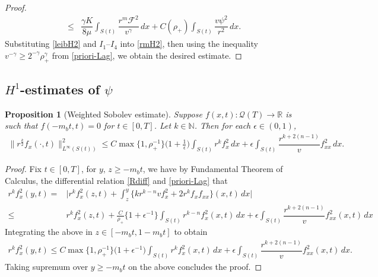 \documentclass[a4paper,12pt,draft]{article}
\newtheorem{proposition}[theorem]{Proposition}
\theoremstyle{remark}
\def\R{\mathbb{R}}
\def\mF{\mathcal{F}}
\def\mQ{\mathcal{Q}}
\begin{document}
\begin{proof}
\begin{align*}
        \le& \dfrac{\gamma K}{8\mu} \int_{S(t)}\!\! \dfrac{r^{m}\mF^2}{v^{\gamma}}\, dx + C(\rho_{+}) \int_{S(t)} \dfrac{v\psi^2}{r^2} \, dx.
    \end{align*}
    Substituting \eqref{leibH2} and $I_1$--$I_4$ into \eqref{rmH2}, then using the inequality $v^{-\gamma} \ge 2^{-\gamma} \rho_+^{\gamma}$ from \eqref{priori-Lag}, we obtain the desired estimate.
\end{proof}

\subsection{\texorpdfstring{$H^1$}{H1}-estimates of \texorpdfstring{$\psi$}{psi}}\label{ssec:H1psi}
\begin{proposition}[Weighted Sobolev estimate]\label{prop:psiSobolev}
    Suppose $f(x,t): \mQ(T)\to \R$ is such that $f(-m_bt,t)=0$ for $t\in[0,T]$. Let $k\in \mathbb{N}$. Then for each $\epsilon \in (0,1)$,
    \begin{align*}
        \| r^{\frac{k}{2}} f_x(\cdot,t) \|_{L^{\infty}(S(t))}^2 \le C \max\{ 1, \rho_{+}^{-1} \} \Big(1 + \frac{1}{\epsilon} \Big)  \int_{S(t)}\!\! r^k f_x^2\, dx + \epsilon \int_{S(t)} \dfrac{r^{k+2(n-1)}}{v}f_{xx}^2\, dx.
    \end{align*}
\end{proposition}
\begin{proof}
    Fix $t\in [0,T]$, for $y,\, z\ge -m_b t $, we have by Fundamental Theorem of Calculus, the differential relation \eqref{Rdiff} and \eqref{priori-Lag} that
    \begin{align*}
        r^k f_x^2 (y,t) =& \bigg| r^k f_x^2 (z,t) + \int_{z}^{y}\Big\{ k r^{k-n} v f_x^2 + 2 r^k f_x f_{xx} \Big\}(x,t) \, dx \bigg|\\
        \le & r^k f_x^2 (z,t) + \frac{C}{\rho_{+}} \big\{1+ \epsilon^{-1}\big\} \int_{S(t)}\!\! r^{k-n} f_x^2(x,t)\, dx + \epsilon\int_{S(t)}\!\!\!\! \dfrac{r^{k+2(n-1)}}{v} f_{xx}^2(x,t)\, dx 
    \end{align*}
    Integrating the above in $z\in [-m_bt, 1-m_bt]$ to obtain
    \begin{align*}
        r^k f_x^2 (y,t) \le C \max\{ 1, \rho_{+}^{-1} \} \big(1+ \epsilon^{-1}\big) \int_{S(t)}\!\! r^k f_x^2(x,t)\, dx + \epsilon \int_{S(t)}\!\!\!\! \dfrac{r^{k+2(n-1)}}{v} f_{xx}^2(x,t)\, dx.
    \end{align*}
    Taking supremum over $y\ge -m_b t$ on the above concludes the proof.
\end{proof}
\end{document}
